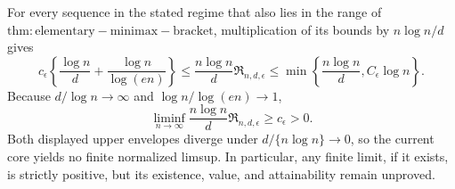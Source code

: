 For every sequence in the stated regime that also lies in the range of \(\mathrm{thm:elementary-minimax-bracket}\), multiplication of its bounds by \(n\log n/d\) gives
\[
 c_\epsilon\left\{\frac{\log n}{d}+\frac{\log n}{\log(en)}\right\}
 \le \frac{n\log n}{d}\mathfrak R_{n,d,\epsilon}
 \le \min\left\{\frac{n\log n}{d},C_\epsilon\log n\right\}.
\]
Because \(d/\log n\to\infty\) and \(\log n/\log(en)\to1\),
\[
 \liminf_{n\to\infty}\frac{n\log n}{d}\mathfrak R_{n,d,\epsilon}\ge c_\epsilon>0.
\]
Both displayed upper envelopes diverge under \(d/\{n\log n\}\to0\), so the current core yields no finite normalized limsup. In particular, any finite limit, if it exists, is strictly positive, but its existence, value, and attainability remain unproved.